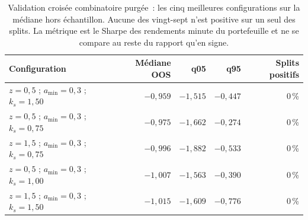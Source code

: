 \begin{table}[htbp]
\centering
\small
\caption{Validation croisée combinatoire purgée~: les cinq meilleures configurations sur la médiane hors échantillon. Aucune des vingt-sept n'est positive sur un seul des splits. La métrique est le Sharpe des rendements minute du portefeuille et ne se compare au reste du rapport qu'en signe.}
\label{tab:x10_cpcv}
\begin{tabular}{l r r r r}
\toprule
\textbf{Configuration} & \textbf{Médiane OOS} & \textbf{q05} & \textbf{q95} & \textbf{Splits positifs} \\
\midrule
$z=0{,}5$ ; $a_{\min}=0{,}3$ ; $k_s=1{,}50$ & $-0{,}959$ & $-1{,}515$ & $-0{,}447$ & $0$\,\% \\
$z=0{,}5$ ; $a_{\min}=0{,}3$ ; $k_s=0{,}75$ & $-0{,}975$ & $-1{,}662$ & $-0{,}274$ & $0$\,\% \\
$z=1{,}5$ ; $a_{\min}=0{,}3$ ; $k_s=0{,}75$ & $-0{,}996$ & $-1{,}882$ & $-0{,}533$ & $0$\,\% \\
$z=0{,}5$ ; $a_{\min}=0{,}3$ ; $k_s=1{,}00$ & $-1{,}007$ & $-1{,}563$ & $-0{,}390$ & $0$\,\% \\
$z=1{,}5$ ; $a_{\min}=0{,}3$ ; $k_s=1{,}50$ & $-1{,}015$ & $-1{,}609$ & $-0{,}776$ & $0$\,\% \\
\bottomrule
\end{tabular}
\end{table}
